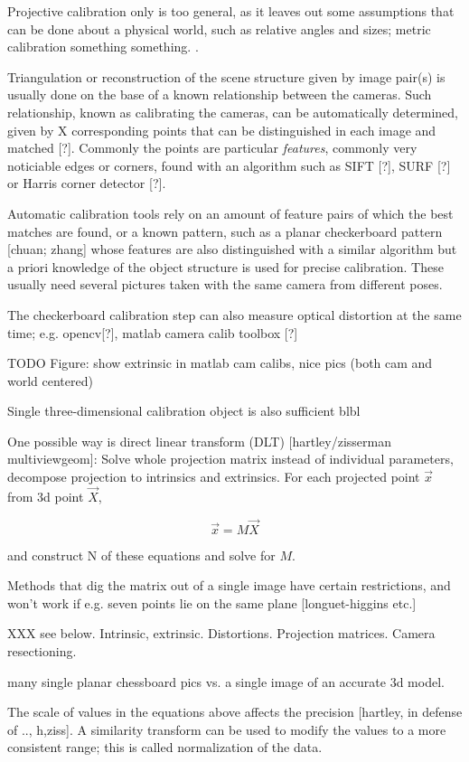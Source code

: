 Projective calibration only is too general, as it leaves out some assumptions that can be done about a physical world, such as relative angles and sizes; metric calibration something something. \cite{zisserman1995metric}.

Triangulation or reconstruction of the scene structure given by image pair(s) is usually done on the base of a known relationship between the cameras.
Such relationship, known as calibrating the cameras, can be automatically determined, given by X corresponding points that can be distinguished in each image and matched [?].
Commonly the points are particular \textit{features}, commonly very noticiable edges or corners, found with an algorithm such as SIFT [?], SURF [?] or Harris corner detector [?].

Automatic calibration tools rely on an amount of feature pairs of which the best matches are found, or a known pattern, such as a planar checkerboard pattern [chuan; zhang] whose features are also distinguished with a similar algorithm but a priori knowledge of the object structure is used for precise calibration.
These usually need several pictures taken with the same camera from different poses.

The checkerboard calibration step can also measure optical distortion at the same time; e.g. opencv[?], matlab camera calib toolbox [?]

TODO Figure: show extrinsic in matlab cam calibs, nice pics (both cam and world centered)

Single three-dimensional calibration object is also sufficient blbl

One possible way is direct linear transform (DLT) [hartley/zisserman multiviewgeom]: Solve whole projection matrix instead of individual parameters, decompose projection to intrinsics and extrinsics. For each projected point $\vec x$ from 3d point $\vec X$,

\[
	\vec x = M \vec X
\]

and construct N of these equations and solve for $M$.

Methods that dig the matrix out of a single image have certain restrictions, and won't work if e.g. seven points lie on the same plane [longuet-higgins etc.]

XXX see below. Intrinsic, extrinsic. Distortions. Projection matrices. Camera resectioning.

many single planar chessboard pics vs. a single image of an accurate 3d model.

The scale of values in the equations above affects the precision [hartley, in defense of .., h,ziss]. A similarity transform can be used to modify the values to a more consistent range; this is called normalization of the data.

